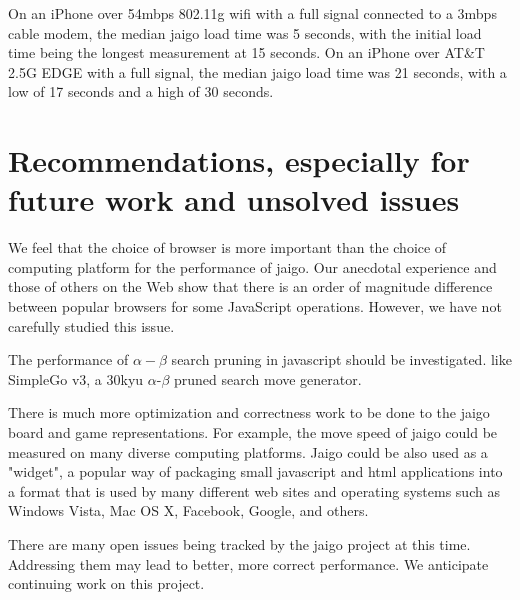 \documentclass{memoir}
\begin{document}
On an iPhone over 54mbps 802.11g wifi with a full signal connected to a 3mbps cable modem, the median jaigo load time was 5 seconds, with the initial load time being the longest measurement at 15 seconds. On an iPhone over AT\&T 2.5G EDGE with a full signal, the median jaigo load time was 21 seconds, with a low of 17 seconds and a high of 30 seconds.

\chapter{Recommendations, especially for future work and unsolved issues}
We feel that the choice of browser is more important than the choice of computing platform for the performance of jaigo. Our anecdotal experience and those of others on the Web show that there is an order of magnitude difference between popular browsers for some JavaScript operations. However, we have not carefully studied this issue.%

The performance of $\alpha-\beta$ search pruning in javascript should be investigated. like SimpleGo v3, a 30kyu $\alpha$-$\beta$ pruned search move generator.

There is much more optimization and correctness work to be done to the jaigo board and game representations. For example, the move speed of jaigo could be measured on many diverse computing platforms. Jaigo could be also used as a "widget", a popular way of packaging small javascript and html applications into a format that is used by many different web sites and operating systems such as Windows Vista, Mac OS X, Facebook, Google, and others.

There are many open issues being tracked by the jaigo project at this time. Addressing them may lead to better, more correct performance. We anticipate continuing work on this project.

\backmatter


\end{document}
